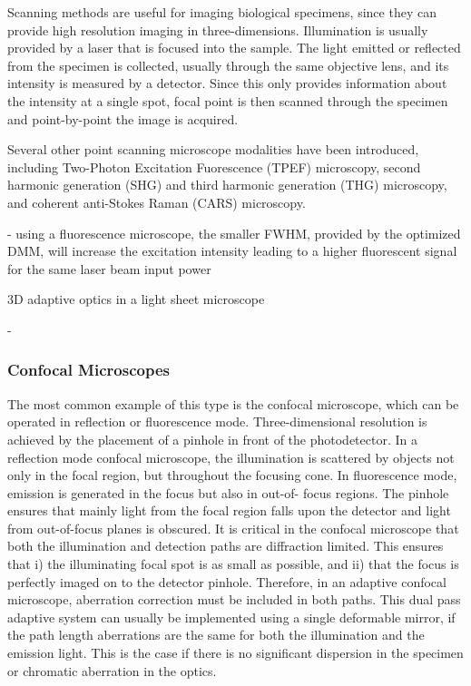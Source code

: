 Scanning methods are useful for imaging biological specimens, since they can provide high resolution imaging in three-dimensions. Illumination is  usually provided by a laser that is focused into the sample. The light emitted or reflected from the specimen is collected, usually through the same objective lens, and its intensity is measured by a detector. Since this only provides information about the intensity at a single spot, focal point is then scanned through the specimen and point-by-point the image is acquired. 

Several other point scanning microscope modalities have been introduced, including Two-Photon Excitation Fuorescence (TPEF) microscopy, second harmonic generation (SHG) and third harmonic generation (THG) microscopy, and coherent anti-Stokes Raman (CARS) microscopy.

- using a fluorescence microscope, the smaller FWHM, provided by the optimized DMM, will increase the excitation intensity leading to a higher fluorescent signal for the same laser beam input power

3D adaptive optics in a light sheet microscope~\cite{scan_lightSheet}

-
\subsubsection{Confocal Microscopes}
\label{sec:ConfocalMicroscopes}

The most common example of this type is the confocal microscope, which can be 
operated in reflection or fluorescence mode. Three-dimensional resolution is 
achieved by the placement of a pinhole in front of the photodetector. In a 
reflection mode confocal microscope, the illumination is scattered by objects 
not only in the focal region, but throughout the focusing cone. In 
fluorescence mode, emission is generated in the focus but also in out-of-
focus regions. The pinhole ensures that mainly light from the focal region 
falls upon the detector and light from out-of-focus planes is obscured. It is 
critical in the confocal microscope that both the illumination and detection 
paths are diffraction limited. This ensures that i) the illuminating focal 
spot is as small as possible, and ii) that the focus is perfectly imaged on 
to the detector pinhole. Therefore, in an adaptive confocal microscope, 
aberration correction must be included in both paths. This dual pass adaptive 
system can usually be implemented using a single deformable mirror, if the 
path length aberrations are the same for both the illumination and the 
emission light. This is the case if there is no significant dispersion in the 
specimen or chromatic aberration in the optics.

